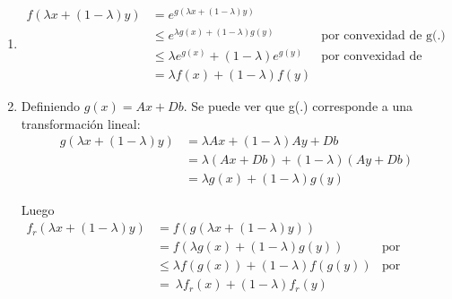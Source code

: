 \begin{enumerate}
  \item
\begin{align*}
    f(\lambda x + (1-\lambda) y)&=e^{g(\lambda x + (1-\lambda) y)}\\
    & \leq e^{\lambda g(x) + (1-\lambda) g(y)} \quad & \text{por convexidad de g(.)}\\
    & \leq \lambda e^{g(x)}+(1-\lambda)e^{g(y)} & \text{por convexidad de exp(.)}\\
    &= \lambda f(x) + (1-\lambda)f(y)
\end{align*}
  \item
Definiendo $g(x) =A x+Db$. Se puede ver que g(.) corresponde a una transformación lineal:
\begin{align*}
g(\lambda x + (1-\lambda)y)&=\lambda A x + (1-\lambda)A y + Db\\
&=\lambda(Ax+Db)+(1-\lambda)(Ay+Db)\\
&=\lambda g(x)+(1-\lambda)g(y)
\end{align*}

Luego
\begin{align*}
    f_r(\lambda x + (1-\lambda) y)&=f(g(\lambda x + (1-\lambda) y))\\
    & = f(\lambda g(x) + (1-\lambda) g(y)) \quad & \text{por linealidad de g(.)}\\
    & \leq \lambda f(g(x)) +(1-\lambda)f(g(y)) & \text{por convexidad de f(.)}\\
    &= \ \lambda f_r(x) +(1-\lambda)f_r(y)
\end{align*}
\end{enumerate}
